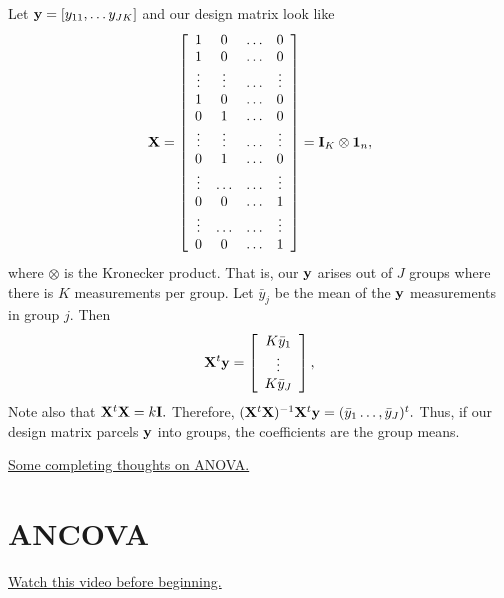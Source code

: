 Let $\mathbf{y} = [y_{11}, \ldots y_{JK}]$ and our design
matrix look like
$$
\mathbf{X} =
\left[
\begin{array}{cccc}
1 & 0  & \ldots & 0 \\
1 & 0  & \ldots & 0 \\
\vdots & \vdots & \ldots  & \vdots \\
1 & 0 & \ldots & 0 \\
0  & 1 & \ldots & 0 \\
\vdots & \vdots & \ldots  & \vdots \\
0  & 1 & \ldots & 0 \\
\vdots & \ldots & \ldots  & \vdots \\
0  & 0 & \ldots & 1 \\
\vdots & \ldots & \ldots  & \vdots \\
0  & 0 & \ldots & 1 \\
\end{array}
\right] = \mathbf{I}_K \otimes \mathbf{1}_n,
$$
where $\otimes$ is the Kronecker product. 
That is, our $\mathbf{y}$ arises out of $J$ groups
where there is $K$ measurements per group. Let
$\bar y_j$ be the mean of the $\mathbf{y}$ measurements
in group $j$. 
Then 
$$
\mathbf{X}^t\mathbf{y} = 
\left[
\begin{array}{c}
K \bar y_1 \\
\vdots \\
K \bar y_J
\end{array}
\right] ,
$$
Note also that 
$\mathbf{X}^t \mathbf{X} = k \mathbf{I}.$ Therefore, $(\mathbf{X}^t \mathbf{X})^{-1} \mathbf{X}^t \mathbf{y} =
(\bar y_1 \ldots, \bar y_J)^t.$ Thus, if 
our design matrix parcels $\mathbf{y}$ into groups,
the coefficients are the group means.

\href{https://www.youtube.com/watch?v=GSTHLCP8x5U&list=PLpl-gQkQivXhdgUCdaUQcdb31CRe8Mm2y&index=30}{Some completing thoughts on ANOVA.}

\section{ANCOVA}

\href{https://www.youtube.com/watch?v=fx5OSXmsy_k&list=PLpl-gQkQivXhdgUCdaUQcdb31CRe8Mm2y&index=31}{Watch this video before beginning.}

